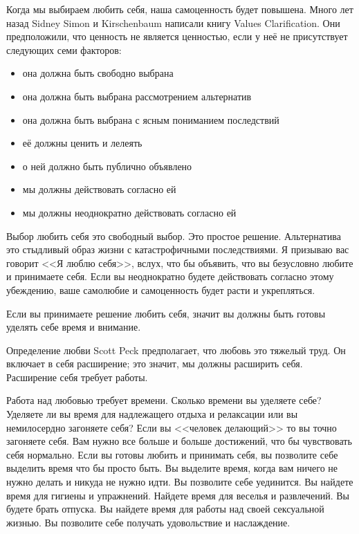 \documentclass[10pt, fleqn]{article}
\begin{document}
Когда мы выбираем любить себя, наша самоценность будет повышена. Много лет назад Sidney Simon и Kirschenbaum написали книгу Values Clarification. Они предположили, что ценность не является ценностью, если у неё не присутствует следующих семи факторов:
\begin{itemize}
\item она должна быть свободно выбрана
\item она должна быть выбрана рассмотрением альтернатив
\item она должна быть выбрана с ясным пониманием последствий
\item её должны ценить и лелеять
\item о ней должно быть публично объявлено
\item мы должны действовать согласно ей
\item мы должны неоднократно действовать согласно ей
\end{itemize}

Выбор любить себя это свободный выбор. Это простое решение. Альтернатива это стыдливый образ жизни с катастрофичными последствиями. Я призываю вас говорит <<Я люблю себя>>, вслух, что бы объявить, что вы безусловно любите и принимаете себя. Если вы неоднократно будете действовать согласно этому убеждению, ваше самолюбие и самоценность будет расти и укрепляться.


Если вы принимаете решение любить себя, значит вы должны быть готовы уделять себе время и внимание.

Определение любви Scott Peck предполагает, что любовь это тяжелый труд. Он включает в себя расширение; это значит, мы должны расширить себя. Расширение себя требует работы.

Работа над любовью требует времени. Сколько времени вы уделяете себе? Уделяете ли вы время для надлежащего отдыха и релаксации или вы немилосердно загоняете себя? Если вы <<человек делающий>> то вы точно загоняете себя. Вам нужно все больше и больше достижений, что бы чувствовать себя нормально. Если вы готовы любить и принимать себя, вы позволите себе выделить время что бы просто быть. Вы выделите время, когда вам ничего не нужно делать и никуда не нужно идти. Вы позволите себе уединится. Вы найдете время для гигиены и упражнений. Найдете время для веселья и развлечений. Вы будете брать отпуска. Вы найдете время для работы над своей сексуальной жизнью. Вы позволите себе получать удовольствие и наслаждение.
\end{document}
